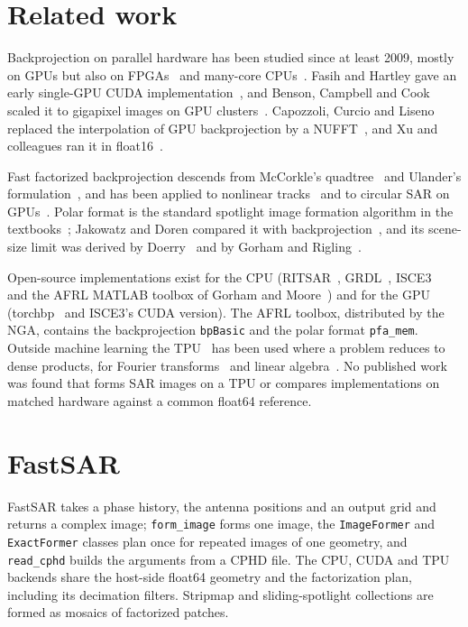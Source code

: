 \documentclass[11pt]{article}
\begin{document}
\section{Related work}
\label{sec:prior}

Backprojection on parallel hardware has been studied since at least 2009, mostly on GPUs but also on FPGAs~\cite{cordes2009} and many-core CPUs~\cite{park2012}. Fasih and Hartley gave an early single-GPU CUDA implementation~\cite{fasih2010}, and Benson, Campbell and Cook scaled it to gigapixel images on GPU clusters~\cite{benson2012}. Capozzoli, Curcio and Liseno replaced the interpolation of GPU backprojection by a NUFFT~\cite{capozzoli2013}, and Xu and colleagues ran it in float16~\cite{xu2022}.

Fast factorized backprojection descends from McCorkle's quadtree~\cite{mccorkle1996} and Ulander's formulation~\cite{ulander2003}, and has been applied to nonlinear tracks~\cite{frey2009} and to circular SAR on GPUs~\cite{ponce2011}. Polar format is the standard spotlight image formation algorithm in the textbooks~\cite{carrara1995,jakowatz1996}; Jakowatz and Doren compared it with backprojection~\cite{jakowatz2006}, and its scene-size limit was derived by Doerry~\cite{doerry2007} and by Gorham and Rigling~\cite{gorham2016}.

Open-source implementations exist for the CPU (RITSAR~\cite{ritsar}, GRDL~\cite{grdl}, ISCE3~\cite{isce3} and the AFRL MATLAB toolbox of Gorham and Moore~\cite{gorham2010}) and for the GPU (torchbp~\cite{torchbp} and ISCE3's CUDA version). The AFRL toolbox, distributed by the NGA, contains the backprojection \texttt{bpBasic} and the polar format \texttt{pfa\_mem}. Outside machine learning the TPU~\cite{jouppi2017,jouppi2023} has been used where a problem reduces to dense products, for Fourier transforms~\cite{lu2020,lu2021} and linear algebra~\cite{lewis2022}. No published work was found that forms SAR images on a TPU or compares implementations on matched hardware against a common float64 reference.

\section{FastSAR}
\label{sec:fastsar}

FastSAR takes a phase history, the antenna positions and an output grid and returns a complex image; \texttt{form\_image} forms one image, the \texttt{ImageFormer} and \texttt{ExactFormer} classes plan once for repeated images of one geometry, and \texttt{read\_cphd} builds the arguments from a CPHD file. The CPU, CUDA and TPU backends share the host-side float64 geometry and the factorization plan, including its decimation filters. Stripmap and sliding-spotlight collections are formed as mosaics of factorized patches.
\end{document}
